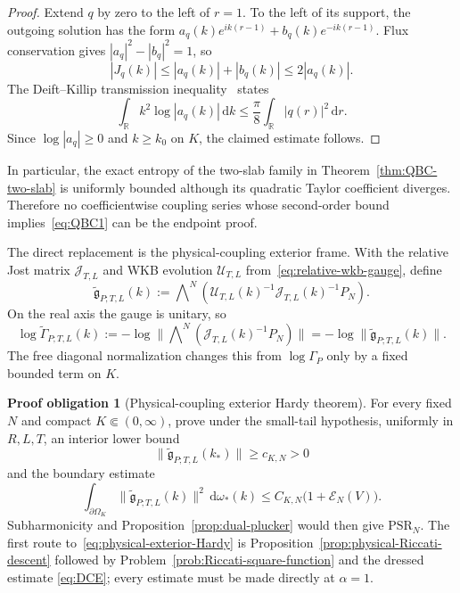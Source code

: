 \documentclass[11pt]{article}
\newcommand{\R}{\mathbb R}
\newcommand{\cE}{\mathcal E}
\newcommand{\dd}{\,\mathrm d}
\newcommand{\wedgeN}{\bigwedge\nolimits^N}
\theoremstyle{definition}
\newtheorem{problem}[theorem]{Proof obligation}
\theoremstyle{remark}
\begin{document}
\begin{proof}
Extend $q$ by zero to the left of $r=1$.  To the left of its support, the
outgoing solution has the form
$a_q(k)e^{ik(r-1)}+b_q(k)e^{-ik(r-1)}$.  Flux conservation gives
$|a_q|^2-|b_q|^2=1$, so
\begin{equation}
 |J_q(k)|\leq |a_q(k)|+|b_q(k)|\leq2|a_q(k)|.
\end{equation}
The Deift--Killip transmission inequality~\cite{DeiftKillip1999} states
\begin{equation}
 \int_\R k^2\log|a_q(k)|\dd k
 \leq\frac{\pi}{8}\int_\R|q(r)|^2\dd r.
\end{equation}
Since $\log|a_q|\geq0$ and $k\geq k_0$ on $K$, the claimed estimate follows.
\end{proof}

In particular, the exact entropy of the two-slab family in
Theorem~\ref{thm:QBC-two-slab} is uniformly bounded although its quadratic
Taylor coefficient diverges.  Therefore no coefficientwise coupling series
whose second-order bound implies~\eqref{eq:QBC1} can be the endpoint proof.

The direct replacement is the physical-coupling exterior frame.  With the
relative Jost matrix $\mathcal J_{T,L}$ and WKB evolution
$\mathcal U_{T,L}$ from~\eqref{eq:relative-wkb-gauge}, define
\begin{equation}
 \widetilde{\mathfrak g}_{P;T,L}(k)
 :=\wedgeN\!\left(
 \mathcal U_{T,L}(k)^{-1}\mathcal J_{T,L}(k)^{-1}P_N
 \right).
 \label{eq:physical-gauged-exterior-frame}
\end{equation}
On the real axis the gauge is unitary, so
\begin{equation}
 \log\widetilde\Gamma_{P;T,L}(k)
 :=-\log\|\wedgeN(\mathcal J_{T,L}(k)^{-1}P_N)\|
 =-\log\|\widetilde{\mathfrak g}_{P;T,L}(k)\|.
\end{equation}
The free diagonal normalization changes this from $\log\Gamma_P$ only by a
fixed bounded term on $K$.

\begin{problem}[Physical-coupling exterior Hardy theorem]
\label{prob:physical-exterior-Hardy}
For every fixed $N$ and compact $K\Subset(0,\infty)$, prove under the small-tail
hypothesis, uniformly in $R,L,T$, an interior lower bound
\begin{equation}
 \|\widetilde{\mathfrak g}_{P;T,L}(k_*)\|\geq c_{K,N}>0
\end{equation}
and the boundary estimate
\begin{equation}
 \int_{\partial\Omega_K}
 \|\widetilde{\mathfrak g}_{P;T,L}(k)\|^2\dd\omega_*(k)
 \leq C_{K,N}\bigl(1+\cE_N(V)\bigr).
 \label{eq:physical-exterior-Hardy}
\end{equation}
Subharmonicity and Proposition~\ref{prop:dual-plucker} would then give
$\mathrm{PSR}_N$.  The first route to~\eqref{eq:physical-exterior-Hardy} is
Proposition~\ref{prop:physical-Riccati-descent} followed by
Problem~\ref{prob:Riccati-square-function} and the dressed estimate
\eqref{eq:DCE}; every estimate must be made directly at $\alpha=1$.
\end{problem}
\end{document}
